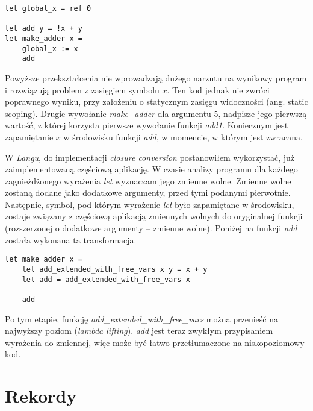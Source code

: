 \documentclass[declaration,shortabstract]{iithesis}
\begin{document}
\begin{lstlisting}[frame=single, caption={Wprowadzenie globalnej zmiennej.}]
let global_x = ref 0

let add y = !x + y 
let make_adder x = 
    global_x := x
    add 
\end{lstlisting}
Powyższe przekształcenia nie wprowadzają dużego narzutu na wynikowy program i rozwiązują 
problem z zasięgiem symbolu $x$. Ten kod jednak nie zwróci poprawnego wyniku, przy założeniu o statycznym zasięgu widoczności (ang. static scoping). Drugie 
wywołanie \textit{make\_adder} dla argumentu 5, nadpisze jego pierwszą wartość, z której korzysta pierwsze wywołanie funkcji \textit{add1}. Koniecznym jest zapamiętanie $x$ w środowisku funkcji 
\textit{add}, w momencie, w którym jest zwracana. 

W \textit{Langu}, do implementacji \textit{closure conversion} postanowiłem wykorzystać,
już zaimplementowaną częściową aplikację. W czasie analizy programu dla każdego 
zagnieżdżonego wyrażenia \textit{let} wyznaczam jego zmienne wolne. Zmienne wolne
zostaną dodane jako dodatkowe argumenty, przed tymi podanymi pierwotnie.
Następnie, symbol, pod którym wyrażenie \textit{let} było zapamiętane w 
środowisku, zostaje związany z częściową aplikacją zmiennych wolnych 
do oryginalnej funkcji (rozszerzonej o dodatkowe argumenty -- zmienne wolne).
Poniżej na funkcji \textit{add} została wykonana ta transformacja.

\begin{lstlisting}[frame=single, caption={Wprowadzenie globalnej zmiennej.}]
let make_adder x = 
    let add_extended_with_free_vars x y = x + y
    let add = add_extended_with_free_vars x

    add
\end{lstlisting}

Po tym etapie, funkcję \textit{add\_extended\_with\_free\_vars} można przenieść 
na najwyższy poziom (\textit{lambda lifting}). \textit{add} jest teraz zwykłym 
przypisaniem wyrażenia do zmiennej, więc może być łatwo przetłumaczone na 
niskopoziomowy kod.




\section{Rekordy}
\end{document}
